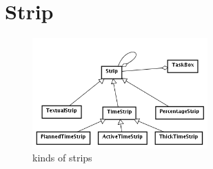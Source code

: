 \section{Strip}
\label{sec:strip}

\begin{figure}[h!] 
	\centering
	\includegraphics[width=0.6\textwidth]{../StripDetail.png}
	\caption{kinds of strips}
	\label{fig:strip} 
\end{figure}